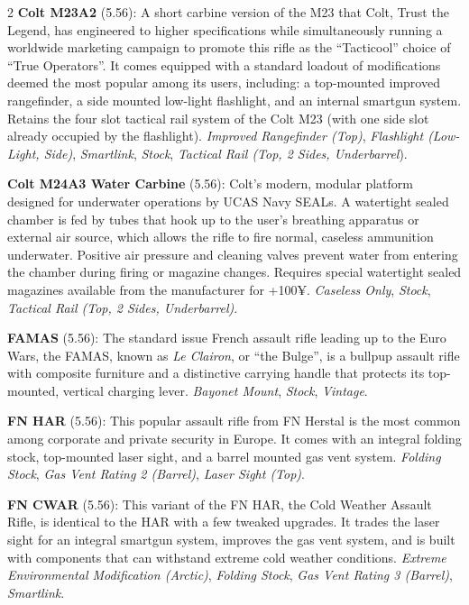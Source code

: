 \documentclass[
  oneside]{article}
\begin{document}
\begin{multicols}{2}
\textbf{Colt M23A2} (5.56): A short carbine
version of the M23 that Colt, Trust the Legend,
has engineered to higher specifications while
simultaneously running a worldwide marketing
campaign to promote this rifle as the
``Tacticool'' choice of ``True Operators''. It
comes equipped with a standard loadout of
modifications deemed the most popular among its
users, including: a top-mounted improved
rangefinder, a side mounted low-light flashlight,
and an internal smartgun system. Retains the four
slot tactical rail system of the Colt M23 (with
one side slot already occupied by the flashlight).
\emph{Improved Rangefinder (Top)},
\emph{Flashlight (Low-Light, Side)},
\emph{Smartlink}, \emph{Stock}, \emph{Tactical
Rail (Top, 2 Sides, Underbarrel}).

\textbf{Colt M24A3 Water Carbine} (5.56): Colt's
modern, modular platform designed for underwater
operations by UCAS Navy SEALs. A watertight sealed
chamber is fed by tubes that hook up to the user's
breathing apparatus or external air source, which
allows the rifle to fire normal, caseless
ammunition underwater. Positive air pressure and
cleaning valves prevent water from entering the
chamber during firing or magazine changes.
Requires special watertight sealed magazines
available from the manufacturer for +100¥.
\emph{Caseless Only}, \emph{Stock}, \emph{Tactical
Rail (Top, 2 Sides, Underbarrel)}.

\textbf{FAMAS} (5.56): The standard issue French
assault rifle leading up to the Euro Wars, the
FAMAS, known as \emph{Le Clairon}, or ``the
Bulge'', is a bullpup assault rifle with composite
furniture and a distinctive carrying handle that
protects its top-mounted, vertical charging lever.
\emph{Bayonet Mount}, \emph{Stock},
\emph{Vintage}.

\textbf{FN HAR} (5.56): This popular assault rifle
from FN Herstal is the most common among corporate
and private security in Europe. It comes with an
integral folding stock, top-mounted laser sight,
and a barrel mounted gas vent system.
\emph{Folding Stock}, \emph{Gas Vent Rating 2
(Barrel)}, \emph{Laser Sight (Top)}.

\textbf{FN CWAR} (5.56): This variant of the FN
HAR, the Cold Weather Assault Rifle, is identical
to the HAR with a few tweaked upgrades. It trades
the laser sight for an integral smartgun system,
improves the gas vent system, and is built with
components that can withstand extreme cold weather
conditions. \emph{Extreme Environmental
Modification (Arctic)}, \emph{Folding Stock},
\emph{Gas Vent Rating 3 (Barrel)},
\emph{Smartlink}.


\end{multicols}
\end{document}

